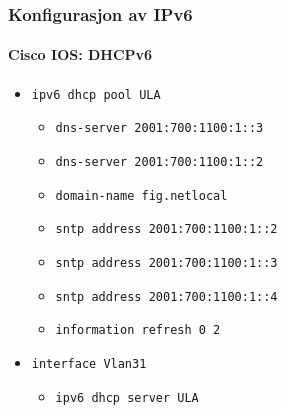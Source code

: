 \begin{frame}%
  \frametitle{Konfigurasjon av IPv6}
  \framesubtitle{Cisco IOS: DHCPv6}
  \begin{itemize}%
  \item \texttt{ipv6 dhcp pool ULA}
    \begin{itemize}%
    \item \texttt{dns-server 2001:700:1100:1::3}
    \item \texttt{dns-server 2001:700:1100:1::2}
    \item \texttt{domain-name fig.netlocal}
    \item \texttt{sntp address 2001:700:1100:1::2}
    \item \texttt{sntp address 2001:700:1100:1::3}
    \item \texttt{sntp address 2001:700:1100:1::4}
    \item \texttt{information refresh 0 2}
    \end{itemize}
  \item \texttt{interface Vlan31}
    \begin{itemize}%
    \item \texttt{ipv6 dhcp server ULA}
    \end{itemize}
  \end{itemize}
\end{frame}

